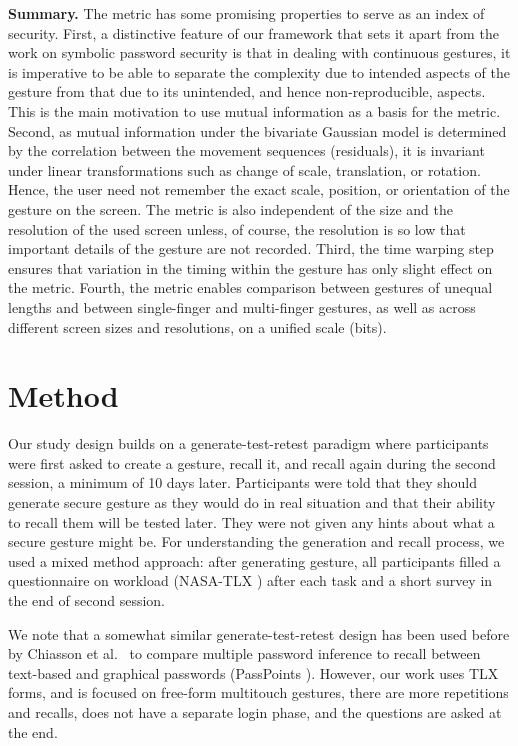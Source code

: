 \documentclass{sig-alternate-10pt}
\begin{document}
\textbf{Summary. } The metric has some promising properties to serve as an index of security. 
First, a distinctive feature of our framework that sets it apart from the work on symbolic password security is that in dealing with continuous gestures, it is imperative to be able to separate the complexity due to intended aspects of the gesture from that due to its
unintended, and hence non-reproducible, aspects. This is the
main motivation to use mutual information as a basis for the metric.
Second, as mutual information under the bivariate Gaussian model is determined by the correlation between the movement sequences (residuals), it is invariant under linear transformations such as change of scale, translation, or rotation. Hence, the user need not remember the exact scale, position, or orientation of the gesture on the screen. The metric is also independent of the size and the resolution of the used screen unless, of course, the resolution is so low that important details of the gesture are not recorded. 
Third, the time warping
step ensures that variation in the timing within the gesture has
only slight effect on the metric. Fourth, the metric enables comparison between gestures of unequal lengths and between single-finger and multi-finger gestures, as well as across different screen sizes and resolutions, on a unified scale (bits).



\section{Method}

Our study design builds on a generate-test-retest paradigm where participants were first asked to create a gesture, recall it, and recall again during the second session, a minimum of 10 days later. Participants were told that they should generate secure gesture as they would do in real situation and that their ability to recall them will be tested later. They were not given any hints about what a secure gesture might be. For understanding the generation and recall process, we used a mixed method approach: after generating gesture, all participants filled a questionnaire on workload (NASA-TLX \cite{hart:tlx}) after each task and a short survey in the end of second session.

We note that a somewhat similar generate-test-retest design has been used before by Chiasson et al.~\cite{Chiasson:2009:MPI:1653662.1653722} to compare multiple password inference to recall between text-based and graphical passwords (PassPoints \cite{Wiedenbeck:2005:PDL:1090412.1090418}). However, our work uses TLX forms, and is focused on free-form multitouch gestures, there are more repetitions and recalls, does not have a separate login phase, and the questions are asked at the end.
\end{document}
